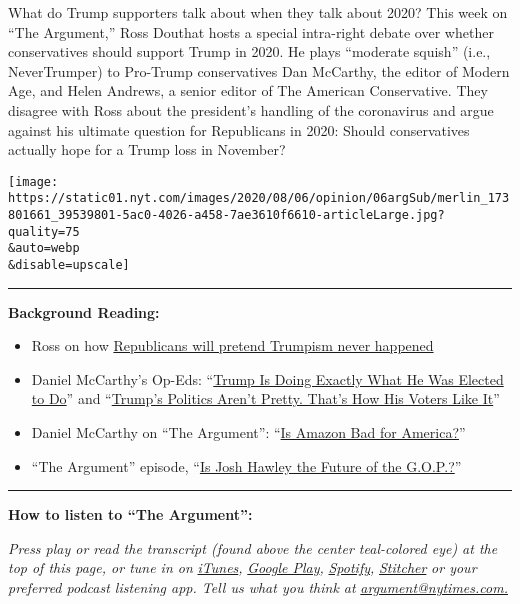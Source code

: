 What do Trump supporters talk about when they talk about 2020? This week
on ``The Argument,'' Ross Douthat hosts a special intra-right debate
over whether conservatives should support Trump in 2020. He plays
``moderate squish'' (i.e., NeverTrumper) to Pro-Trump conservatives Dan
McCarthy, the editor of Modern Age, and Helen Andrews, a senior editor
of The American Conservative. They disagree with Ross about the
president's handling of the coronavirus and argue against his ultimate
question for Republicans in 2020: Should conservatives actually hope for
a Trump loss in November?

\texttt{[image: https://static01.nyt.com/images/2020/08/06/opinion/06argSub/merlin\_173801661\_39539801-5ac0-4026-a458-7ae3610f6610-articleLarge.jpg?quality=75\\\&auto=webp\\\&disable=upscale]}

\begin{center}\rule{0.5\linewidth}{\linethickness}\end{center}

\textbf{Background Reading:}

\begin{itemize}
\item
  Ross on how
  \href{https://www.nytimes.com/2020/08/04/opinion/trump-republicans-tea-party.html}{Republicans
  will pretend Trumpism never happened}
\item
  Daniel McCarthy's Op-Eds:
  ``\href{https://www.nytimes.com/2019/11/20/opinion/trump-impeachment.html}{Trump
  Is Doing Exactly What He Was Elected to Do}'' and
  ``\href{https://www.nytimes.com/2019/10/12/opinion/sunday/trump-impeachment-congress.html}{Trump's
  Politics Aren't Pretty. That's How His Voters Like It}''
\item
  Daniel McCarthy on ``The Argument'':
  ``\href{https://www.nytimes.com/2018/11/15/opinion/the-argument-amazon-headquarters-trump-republicans-cbd-gummies.html}{Is
  Amazon Bad for America?}''
\item
  ``The Argument'' episode,
  ``\href{https://www.nytimes.com/2019/08/15/opinion/the-argument-josh-hawley.html}{Is
  Josh Hawley the Future of the G.O.P.?}''
\end{itemize}

\begin{center}\rule{0.5\linewidth}{\linethickness}\end{center}

\textbf{How to listen to ``The Argument'':}

\emph{Press play or read the transcript (found above the center
teal-colored eye) at the top of this page, or tune in on}
\href{https://itunes.apple.com/us/podcast/the-argument/id1438024613?mt=2}{\emph{iTunes}}\emph{,}
\href{https://play.google.com/music/listen?u=0\#/ps/Idxib4hsg3yviao4gtym76knjjy}{\emph{Google
Play}}\emph{,}
\href{https://open.spotify.com/episode/5fIsHqqunLBwoxPSUUSGre?si=Rz5D9VnlRFKdGMu8ixzBOw}{\emph{Spotify}}\emph{,}
\href{https://www.stitcher.com/podcast/the-new-york-times/the-argument}{\emph{Stitcher}}
\emph{or your preferred podcast listening app. Tell us what you think
at} \href{mailto:argument@nytimes.com}{\emph{argument@nytimes.com.}}

